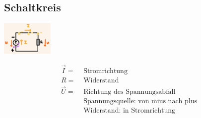 \subsection{Schaltkreis}
    \vspace{-1mm}
    \begin{minipage}{0.49\linewidth}
        \begin{footnotesize}
            \begin{center}
                \vspace{2mm}
                \includegraphics[width = 25mm]{src/images/schaltkreis.png}
            \end{center}
        \end{footnotesize}
    \end{minipage}
    \begin{minipage}{0.5\linewidth}
        \begin{scriptsize}
            \begin{center}
                \begin{align*}
                    \vec{I} = &\text{ Stromrichtung}
                    \\R = &\text{ Widerstand} 
                    \\\vec{U} = &\text{ Richtung des Spannungsabfall}
                    \\&\text{ Spannungsquelle: von mius nach plus}
                    \\&\text{ Widerstand: in Stromrichtung}
                \end{align*}
            \end{center}
        \end{scriptsize}
    \end{minipage}

